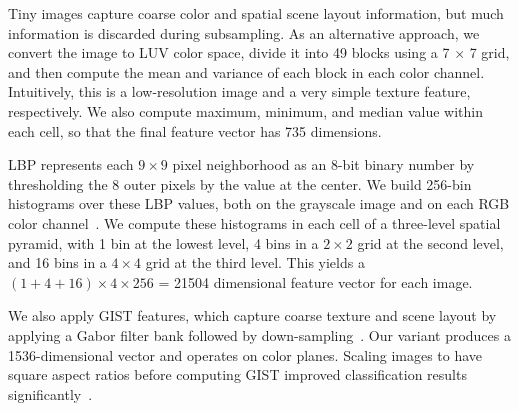  Tiny images capture coarse color and spatial
scene layout information, but much information is discarded during
subsampling.  As an alternative approach, we convert the image to LUV
color space, divide it into 49 blocks using a 7 $\times$ 7 grid, and
then compute the mean and variance of each block in each color
channel.  Intuitively, this is a low-resolution image and a very
simple texture feature, respectively.  We also compute maximum,
minimum, and median value within each cell, so that the final
feature vector has 735 dimensions.




 LBP represents each $9 \times 9$ pixel neighborhood 
as an 8-bit binary number by thresholding the 8 outer pixels
by the value at the center.  We build 256-bin histograms over
these LBP values, both on the grayscale image and on each RGB color
channel~\cite{korayem2012solving}. We compute these histograms in each cell of a three-level spatial
pyramid, with 1 bin at the lowest level, 4 bins in a $2 \times 2$ grid
at the second level, and 16 bins in a $4 \times 4$ grid at the third level.
This yields a $(1+4+16) \times 4 \times 256$ = 21504 dimensional feature
vector for each image.

 We also apply GIST features, which capture coarse texture
and scene layout by applying a Gabor filter bank followed by
down-sampling~\cite{oliva2001modeling}. Our variant produces a
1536-dimensional  vector and operates on color planes. Scaling
images to have square aspect ratios before computing GIST improved
classification results significantly~\cite{douze2009evaluation}.



